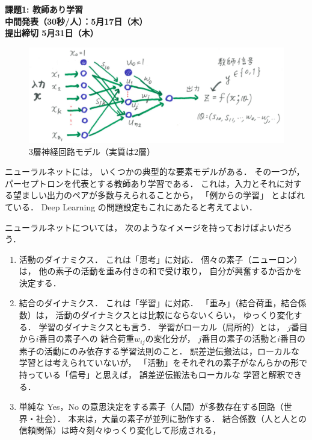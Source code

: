 \documentclass[a4paper,11pt]{jarticle}
\begin{document}
\setlength{\baselineskip}{7mm}
\lfoot{}
\lhead{}

\begin{center}
{\large\bf 課題1: 教師あり学習\\
中間発表（30秒/人）：5月17日（木）\\
提出締切 5月31日（木）
}\\
\begin{figure}[hbt]
\begin{center}
\includegraphics[width=.8\linewidth]{figs/nn20180425.eps}
\caption{3層神経回路モデル（実質は2層）\label{fig:3layer}}
\end{center}
\end{figure}
\end{center}


ニューラルネットには，
いくつかの典型的な要素モデルがある．%
その一つが，パーセプトロンを代表とする教師あり学習である．
これは，入力とそれに対する望ましい出力のペアが多数与えられることから，
「例からの学習」
\cite{rumelhart86b}
とよばれている．
Deep Learning の問題設定もこれにあたると考えてよい．
\vskip 2mm

ニューラルネットについては，
次のようなイメージを持っておけばよいだろう．
\begin{enumerate}
\item 活動のダイナミクス．
これは「思考」に対応．
個々の素子（ニューロン）は，
他の素子の活動を重み付きの和で受け取り，
自分が興奮するか否かを決定する．

\item 結合のダイナミクス．
これは「学習」に対応．
      「重み」（結合荷重，結合係数）は，
活動のダイナミクスとは比較にならないくらい，
ゆっくり変化する．
学習のダイナミクスとも言う．
学習がローカル（局所的）とは，
$j$番目から$i$番目の素子への
結合荷重$w_{ij}$の変化分が，
$j$番目の素子の活動と$i$番目の素子の活動にのみ依存する学習法則のこと．
誤差逆伝搬法は，ローカルな学習とは考えられていないが，
「活動」をそれぞれの素子がなんらかの形で持っている「信号」と思えば，
      誤差逆伝搬法\cite{rumelhart86b,amari88c,sgeman92a}もローカルな
      学習と解釈できる．

\item 
単純な Yes，No の意思決定をする素子（人間）が多数存在する回路（世界・社会）．
本来は，大量の素子が並列に動作する．
結合係数（人と人との信頼関係）は時々刻々ゆっくり変化して形成される，

\end{enumerate}
\end{document}
